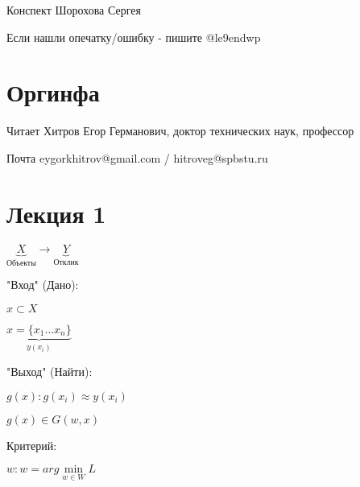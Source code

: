 \documentclass[12pt]{article}
\begin{document}
\begin{flushright}
    Конспект Шорохова Сергея

    Если нашли опечатку/ошибку - пишите @le9endwp 
\end{flushright}

\tableofcontents
\newpage

\section{Оргинфа}

Читает Хитров Егор Германович, доктор технических наук, профессор

Почта eygorkhitrov@gmail.com / hitroveg@spbstu.ru

\section{Лекция 1}

$\underbrace{X}_\text{Объекты} \to \underbrace{Y}_\text{Отклик}$

"Вход" (Дано):

$x \subset X$

$\underbrace{x = \{x_1 \ldots x_n\}}_{y(x_i)}$

"Выход" (Найти):

$g(x) : g(x_i) \approx y(x_i)$

$g(x) \in G(w, x)$

Критерий:

$w : w = arg\min\limits_{w \in W} L$
\end{document}

